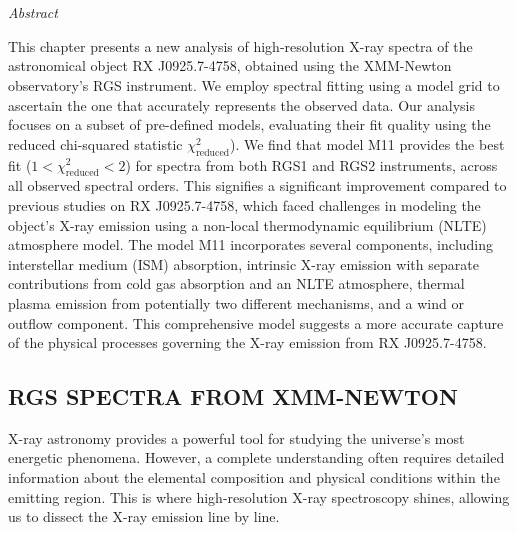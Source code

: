 \chapter{\MakeUppercase{\ChapterTitleFour}} \label{chap:hi-resolution}
    \minitoc
    
    \newpage
    \begin{center}
    	\emph{Abstract}
    \end{center}
    This chapter presents a new analysis of high-resolution X-ray spectra of the astronomical object RX J0925.7-4758, obtained using the XMM-Newton observatory's RGS instrument. We employ spectral fitting using a model grid to ascertain the one that accurately represents the observed data. Our analysis focuses on a subset of pre-defined models, evaluating their fit quality using the reduced chi-squared statistic $\chi^2_\text{reduced}$). We find that model M11 provides the best fit ($1<\chi^2_\text{reduced}<2$) for spectra from both RGS1 and RGS2 instruments, across all observed spectral orders. This signifies a significant improvement compared to previous studies on RX J0925.7-4758, which faced challenges in modeling the object's X-ray emission using a non-local thermodynamic equilibrium (NLTE) atmosphere model. The model M11 incorporates several components, including interstellar medium (ISM) absorption, intrinsic X-ray emission with separate contributions from cold gas absorption and an NLTE atmosphere, thermal plasma emission from potentially two different mechanisms, and a wind or outflow component. This comprehensive model suggests a more accurate capture of the physical processes governing the X-ray emission from RX J0925.7-4758.
    
    \setcounter{footnote}{\value{footnotecount}}

	\newpage
	\section{\MakeUppercase{RGS Spectra from XMM-Newton}} \label{hi-resolution:rgs-spec}
		X-ray astronomy provides a powerful tool for studying the universe's most energetic phenomena. However, a complete understanding often requires detailed information about the elemental composition and physical conditions within the emitting region. This is where high-resolution X-ray spectroscopy shines, allowing us to dissect the X-ray emission line by line.
		
